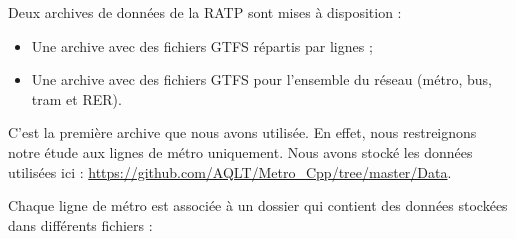 \documentclass[,french]{article}
\providecommand{\tightlist}{%
  \setlength{\itemsep}{0pt}\setlength{\parskip}{0pt}}
\begin{document}
Deux archives de données de la RATP sont mises à disposition :

\begin{itemize}
\tightlist
\item
  Une archive avec des fichiers GTFS répartis par lignes ;\\
\item
  Une archive avec des fichiers GTFS pour l'ensemble du réseau (métro,
  bus, tram et RER).
\end{itemize}

C'est la première archive que nous avons utilisée. En effet, nous
restreignons notre étude aux lignes de métro uniquement. Nous avons
stocké les données utilisées ici :
\url{https://github.com/AQLT/Metro_Cpp/tree/master/Data}.

Chaque ligne de métro est associée à un dossier qui contient des données
stockées dans différents fichiers :
\end{document}
